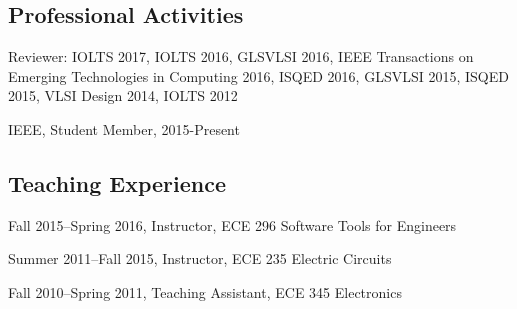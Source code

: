 \documentclass[letterpaper]{article}
\renewenvironment{itemize}{
  \begin{list}{}{
    \setlength{\leftmargin}{1.5em}
  }
}{
  \end{list}
}
\begin{document}
\subsection*{Professional Activities}

\begin{itemize}
	\item Reviewer: IOLTS 2017, IOLTS 2016, GLSVLSI 2016,  IEEE Transactions on Emerging Technologies in Computing 2016, ISQED 2016, GLSVLSI 2015, ISQED 2015, VLSI Design 2014, IOLTS 2012
	\item IEEE, Student Member, 2015-Present
\end{itemize}

\subsection*{Teaching Experience}

\begin{itemize}
	\item Fall 2015--Spring 2016, Instructor, ECE 296 Software Tools for Engineers
	\item Summer 2011--Fall 2015, Instructor, ECE 235 Electric Circuits
	\item Fall 2010--Spring 2011, Teaching Assistant, ECE 345 Electronics
\end{itemize}
\end{document}
